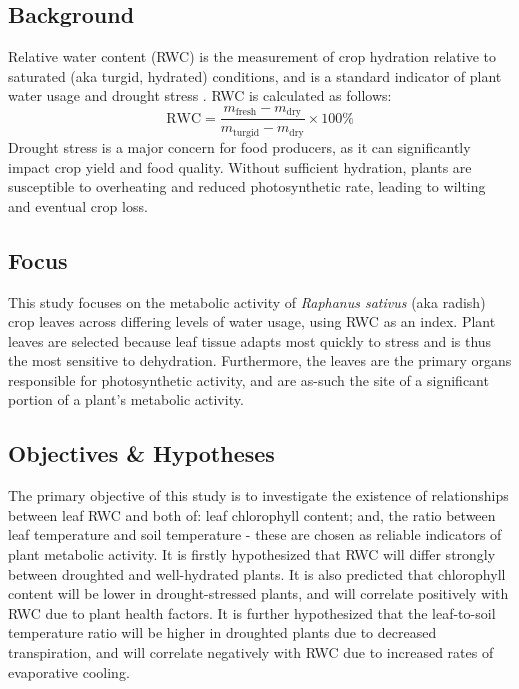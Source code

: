 \documentclass{report}
\begin{document}

\subsection{Background}


\hspace{24pt}Relative water content (RWC) is the measurement of crop hydration relative to saturated (aka turgid, hydrated) conditions, and is a standard indicator of plant water usage and drought stress \parencite{drought}. RWC is calculated as follows:
\[ \text{RWC} = \frac{m_\text{fresh} - m_\text{dry}}{m_\text{turgid} - m_\text{dry}} \times 100\% \]
Drought stress is a major concern for food producers, as it can significantly impact crop yield and food quality. Without sufficient hydration, plants are susceptible to overheating and reduced photosynthetic rate, leading to wilting and eventual crop loss.

\subsection{Focus}

\hspace{24pt}This study focuses on the metabolic activity of \textit{Raphanus sativus} (aka radish) crop leaves across differing levels of water usage, using RWC as an index. Plant leaves are selected because leaf tissue adapts most quickly to stress and is thus the most sensitive to dehydration. Furthermore, the leaves are the primary organs responsible for photosynthetic activity, and are as-such the site of a significant portion of a plant's metabolic activity.

\subsection{Objectives \& Hypotheses}

\hspace{24pt}The primary objective of this study is to investigate the existence of relationships between leaf RWC and both of: leaf chlorophyll content; and, the ratio between leaf temperature and soil temperature - these are chosen as reliable indicators of plant metabolic activity. It is firstly hypothesized that RWC will differ strongly between droughted and well-hydrated plants. It is also predicted that chlorophyll content will be lower in drought-stressed plants, and will correlate positively with RWC due to plant health factors. It is further hypothesized that the leaf-to-soil temperature ratio will be higher in droughted plants due to decreased transpiration, and will correlate negatively with RWC due to increased rates of evaporative cooling.
\end{document}
